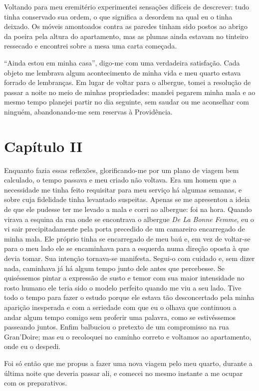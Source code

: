 Voltando para meu eremitério experimentei sensações difíceis de
descrever: tudo tinha conservado sua ordem, o que significa a desordem
na qual eu o tinha deixado. Os móveis amontoados contra as paredes
tinham sido postos ao abrigo da poeira pela altura do apartamento, mas
as plumas ainda estavam no tinteiro ressecado e encontrei sobre a mesa
uma carta começada.

``Ainda estou em minha casa'', digo-me com uma verdadeira satisfação. Cada
objeto me lembrava algum acontecimento de minha vida e meu quarto
estava forrado de lembranças. Em lugar de voltar para o albergue, tomei
a resolução de passar a noite no meio de minhas propriedades: mandei
pegarem minha mala e ao mesmo tempo planejei partir no dia seguinte,
sem saudar ou me aconselhar com ninguém, abandonando-me sem reservas à
Providência.

\section*{Capítulo II}

 Enquanto fazia essas reflexões, glorificando-me por um plano de viagem
bem calculado, o tempo passava e meu criado não voltava. Era um homem
que a necessidade me tinha feito requisitar para meu serviço há algumas
semanas, e sobre cuja fidelidade tinha levantado suspeitas. Apenas se
me apresentou a ideia de que ele pudesse ter me levado a mala e corri
ao albergue: foi na hora. Quando virava a esquina da rua onde se
encontrava o albergue \textit{De La Bonne Femme}, eu o vi sair
precipitadamente pela porta precedido de um camareiro encarregado de
minha mala. Ele próprio tinha se encarregado de meu baú e, em vez de
voltar-se para o meu lado ele se encaminhava para a esquerda numa
direção oposta à que devia tomar. Sua intenção tornava-se manifesta.
Segui-o com cuidado e, sem dizer nada, caminhava já há algum tempo
junto dele antes que percebesse. Se quiséssemos pintar a expressão de
susto e temor com sua maior intensidade no rosto humano ele teria sido
o modelo perfeito quando me viu a seu lado. Tive todo o tempo para
fazer o estudo porque ele estava tão desconcertado pela minha aparição
inesperada e com a seriedade com que eu o olhava que continuou a andar
algum tempo comigo sem proferir uma palavra, como se estivéssemos
passeando juntos. Enfim balbuciou o pretexto de um compromisso na rua
Gran’Doire; mas eu o recoloquei no caminho correto e voltamos ao
apartamento, onde eu o despedi.

 Foi só então que me propus a fazer uma nova viagem pelo meu quarto,
durante a última noite que deveria passar ali, e comecei no mesmo
instante a me ocupar com os preparativos. 

